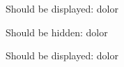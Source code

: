 \documentclass{article}
\begin{document}
{}

Should be displayed:  dolor

\clozehide

Should be hidden:  dolor

\clozeshow

Should be displayed:  dolor
\end{document}
